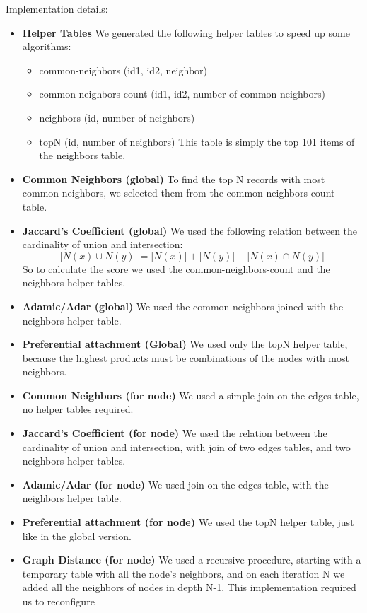 Implementation details:
\begin{itemize}
	\item {\bf Helper Tables} 
        We generated the following helper tables to speed up some algorithms:
		\begin{itemize}
			\item {common-neighbors (id1, id2, neighbor)}
			\item {common-neighbors-count (id1, id2, number of common neighbors)}
			\item {neighbors (id, number of neighbors)}
			\item {topN (id, number of neighbors)}
				This table is simply the top 101 items of the neighbors table.
		\end{itemize}
	\item {\bf Common Neighbors (global)} 
		To find the top N records with most common neighbors, 
		we selected them from the common-neighbors-count table.
	\item {\bf Jaccard's Coefficient (global)} 
		We used the following relation between the cardinality of union and intersection:
		\[{|N(x) \cup N(y)|} = {|N(x)| + |N(y)| - |N(x) \cap N(y)|}\]
		So to calculate the score we used the common-neighbors-count and 
		the neighbors helper tables.
	\item {\bf Adamic/Adar (global)} 
		We used the common-neighbors joined with the neighbors helper table.
	\item {\bf Preferential attachment (Global)}
		We used only the topN helper table, because the highest products 
		must be combinations of the nodes with most neighbors.
	\item {\bf Common Neighbors (for node)}
		We used a simple join on the edges table, no helper tables required.
	\item {\bf Jaccard's Coefficient (for node)}
		We used the relation between the cardinality of union and intersection,
		with join of two edges tables, and two neighbors helper tables.
	\item {\bf Adamic/Adar (for node)}
		We used join on the edges table, with the neighbors helper table.
	\item {\bf Preferential attachment (for node)}
		We used the topN helper table, just like in the global version.
	\item {\bf Graph Distance (for node)}
		We used a recursive procedure, starting with a temporary table with all 
		the node's neighbors, and on each iteration N we added all the neighbors 
		of nodes in depth N-1. This implementation required us to reconfigure 

\end{itemize}
